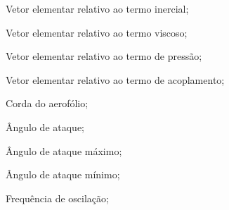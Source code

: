 \begin{simbolos}
   \item[$\mathbf{j}$]  Vetor elementar relativo ao termo inercial;
   \item[$\mathbf{k}$] Vetor elementar relativo ao termo viscoso;
   \item[$\mathbf{p}$] Vetor elementar relativo ao termo de pressão;
   \item[$\mathbf{\boundary}$] Vetor elementar relativo ao termo de acoplamento;
   \item[$C$] Corda do aerofólio;	
   \item[$\theta$] Ângulo de ataque;
   \item[$\theta_{max}$] Ângulo de ataque máximo;
   \item[$\theta_{min}$] Ângulo de ataque mínimo;
   \item[$f_{o}$] Frequência de oscilação;
   

\end{simbolos}
